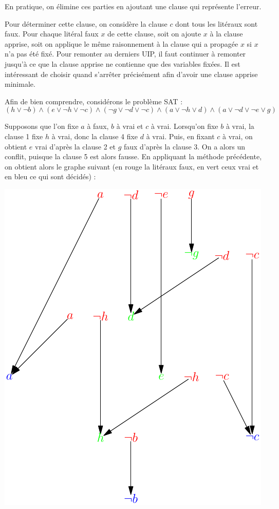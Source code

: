 En pratique, on élimine ces parties en ajoutant une clause qui représente
l'erreur.

Pour déterminer cette clause, on considère la clause $c$ dont tous les litéraux
sont faux. Pour chaque litéral faux $x$ de cette clause, soit on ajoute $x$ à
la clause apprise, soit on applique le même raisonnement à la clause qui a
propagée $x$ si $x$ n'a pas été fixé. Pour remonter au derniers UIP, il faut
continuer à remonter jusqu'à ce que la clause apprise ne contienne que des
variables fixées. Il est intéressant de choisir quand s'arrêter précisément
afin d'avoir une clause apprise minimale.

Afin de bien comprendre, considérons le problème SAT :
\[ (h\vee\neg b) \wedge (e\vee\neg h\vee\neg c)
   \wedge (\neg g\vee\neg d\vee\neg c) \wedge (a\vee\neg h\vee d)
   \wedge (a\vee\neg d\vee\neg e\vee g)\]

Supposons que l'on fixe $a$ à faux, $b$ à vrai et $c$ à vrai. Lorsqu'on fixe
$b$ à vrai, la clause 1 fixe $h$ à vrai, donc la clause 4 fixe $d$ à vrai.
Puis, en fixant $c$ à vrai, on obtient $e$ vrai d'après la clause 2 et $g$
faux d'après la clause 3. On a alors un conflit, puisque la clause 5 est alors
fausse. En appliquant la méthode précédente, on obtient alors le graphe
suivant (en rouge la litéraux faux, en vert ceux vrai et en bleu ce qui sont
décidés) :
\begin{center}
\includegraphics[width=0.5\linewidth]{reso/graph.pdf}
\end{center}

